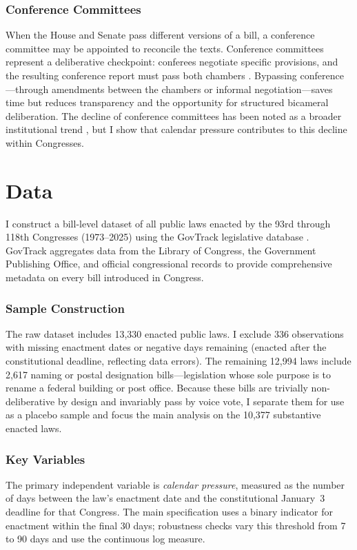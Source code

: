 \documentclass[12pt]{article}
\begin{document}
\subsubsection*{Conference Committees} When the House and Senate pass different versions of a bill, a conference committee may be appointed to reconcile the texts. Conference committees represent a deliberative checkpoint: conferees negotiate specific provisions, and the resulting conference report must pass both chambers \citep{Longley1989}. Bypassing conference---through amendments between the chambers or informal negotiation---saves time but reduces transparency and the opportunity for structured bicameral deliberation. The decline of conference committees has been noted as a broader institutional trend \citep{Sinclair2012}, but I show that calendar pressure contributes to this decline within Congresses.


\section{Data}

I construct a bill-level dataset of all public laws enacted by the 93rd through 118th Congresses (1973--2025) using the GovTrack legislative database \citep{GovTrack2024}. GovTrack aggregates data from the Library of Congress, the Government Publishing Office, and official congressional records to provide comprehensive metadata on every bill introduced in Congress.

\subsubsection*{Sample Construction} The raw dataset includes 13,330 enacted public laws. I exclude 336 observations with missing enactment dates or negative days remaining (enacted after the constitutional deadline, reflecting data errors). The remaining 12,994 laws include 2,617 naming or postal designation bills---legislation whose sole purpose is to rename a federal building or post office. Because these bills are trivially non-deliberative by design and invariably pass by voice vote, I separate them for use as a placebo sample and focus the main analysis on the 10,377 substantive enacted laws.

\subsubsection*{Key Variables} The primary independent variable is \textit{calendar pressure}, measured as the number of days between the law's enactment date and the constitutional January~3 deadline for that Congress. The main specification uses a binary indicator for enactment within the final 30 days; robustness checks vary this threshold from 7 to 90 days and use the continuous log measure.
\end{document}
